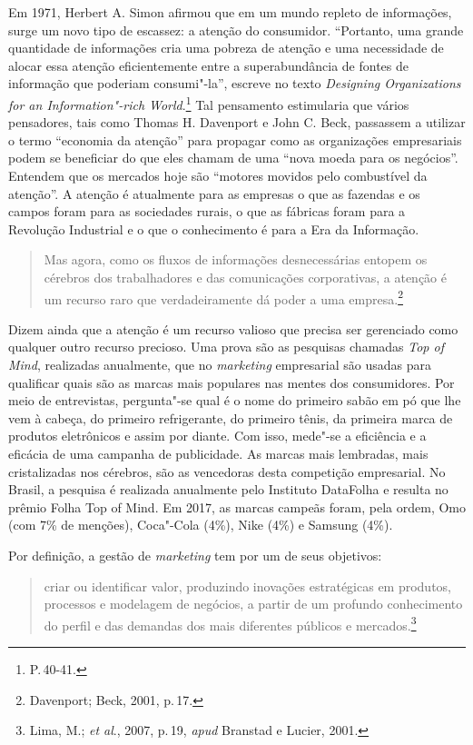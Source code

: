 Em 1971, Herbert A. Simon afirmou que em um mundo repleto de
informações, surge um novo tipo de escassez: a atenção do consumidor.
``Portanto, uma grande quantidade de informações cria uma pobreza de
atenção e uma necessidade de alocar essa atenção eficientemente entre a
superabundância de fontes de informação que poderiam consumi"-la'',
escreve no texto \emph{Designing Organizations for an Information"-rich
World}.\footnote{P.\,40-41.} Tal pensamento estimularia que vários pensadores,
tais como Thomas H. Davenport e John C. Beck, passassem a utilizar o
termo ``economia da atenção'' para propagar como as organizações
empresariais podem se beneficiar do que eles chamam de uma ``nova moeda
para os negócios''. Entendem que os mercados hoje são ``motores movidos
pelo combustível da atenção''. A atenção é atualmente para as empresas o
que as fazendas e os campos foram para as sociedades rurais, o que as
fábricas foram para a Revolução Industrial e o que o conhecimento é para
a Era da Informação.

\begin{quote}
Mas agora, como os fluxos de informações desnecessárias entopem os
cérebros dos trabalhadores e das comunicações corporativas, a atenção é
um recurso raro que verdadeiramente dá poder a uma empresa.\footnote{Davenport; Beck, 2001, p.\,17.}
\end{quote}

Dizem ainda que a atenção é um recurso valioso que precisa ser
gerenciado como qualquer outro recurso precioso. Uma prova são as
pesquisas chamadas \emph{Top of Mind}, realizadas anualmente, que no
\emph{marketing} empresarial são usadas para qualificar quais são as
marcas mais populares nas mentes dos consumidores. Por meio de
entrevistas, pergunta"-se qual é o nome do primeiro sabão em pó que lhe
vem à cabeça, do primeiro refrigerante, do primeiro tênis, da primeira
marca de produtos eletrônicos e assim por diante. Com isso, mede"-se a
eficiência e a eficácia de uma campanha de publicidade. As marcas mais
lembradas, mais cristalizadas nos cérebros, são as vencedoras desta
competição empresarial. No Brasil, a pesquisa é realizada anualmente
pelo Instituto DataFolha e resulta no prêmio Folha Top of Mind. Em 2017,
as marcas campeãs foram, pela ordem, Omo (com 7\% de menções), Coca"-Cola
(4\%), Nike (4\%) e Samsung (4\%).

Por definição, a gestão de \emph{marketing} tem por um de seus
objetivos:

\begin{quote}
criar ou identificar valor, produzindo inovações estratégicas em
produtos, processos e modelagem de negócios, a partir de um profundo
conhecimento do perfil e das demandas dos mais diferentes públicos e
mercados.\footnote{Lima, M.; \emph{et al}., 2007, p.\,19, \emph{apud} Branstad e Lucier, 2001.}
\end{quote}

